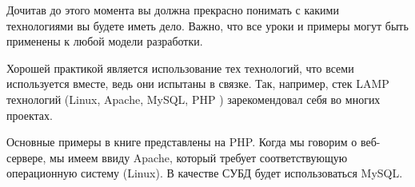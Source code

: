 Дочитав до этого момента вы должна прекрасно понимать с какими технологиями вы будете иметь дело. Важно, что все уроки и примеры могут быть применены к любой модели разработки.

Хорошей практикой является использование тех технологий, что всеми используется вместе, ведь они испытаны в связке. Так, например, стек LAMP технологий (Linux, Apache, MySQL, PHP ) зарекомендовал себя во многих проектах. 

Основные примеры в книге представлены на PHP. Когда мы говорим о веб-сервере, мы имеем ввиду Apache, который требует соответствующую операционную систему (Linux). В качестве СУБД будет использоваться MySQL. 




































\clearpage


